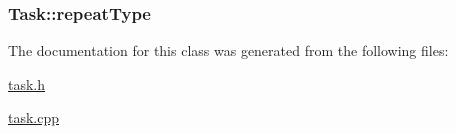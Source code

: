 \subsubsection[{\texorpdfstring{repeat\+Type}{repeatType}}]{ Task\+::repeat\+Type\hspace{0.3cm}{\ttfamily [private]}}\hypertarget{classTask_adf98bd28ce45d18bcc9f337cc425fd89}{}\label{classTask_adf98bd28ce45d18bcc9f337cc425fd89}


The documentation for this class was generated from the following files\+:\begin{DoxyCompactItemize}
\item 
\hyperlink{task_8h}{task.\+h}\item 
\hyperlink{task_8cpp}{task.\+cpp}\end{DoxyCompactItemize}
